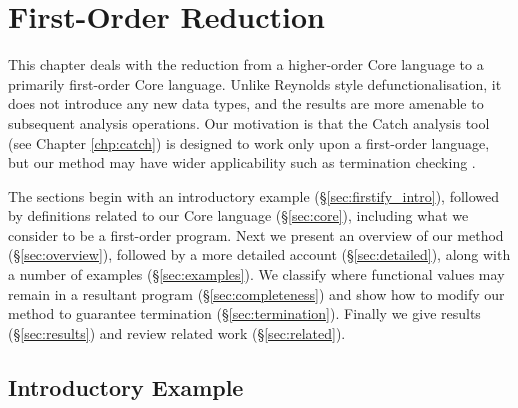 


\newenvironment{definition}
    {\smallskip
     \noindent\textbf{Definition:}}
    {\noexample}

\begin{comment}
\begin{code}
f = undefined
\end{code}
\begin{code}
primNeqInt, primEqInt :: Int -> Int -> Bool
\end{code}
\end{comment}



\chapter{First-Order Reduction}

This chapter deals with the reduction from a higher-order Core language to a primarily first-order Core language. Unlike Reynolds style defunctionalisation, it does not introduce any new data types, and the results are more amenable to subsequent analysis operations. Our motivation is that the Catch analysis tool (see Chapter \ref{chp:catch}) is designed to work only upon a first-order language, but our method may have wider applicability such as termination checking \cite{sereni:higher_order_termination}.

The sections begin with an introductory example (\S\ref{sec:firstify_intro}), followed by definitions related to our Core language (\S\ref{sec:core}), including what we consider to be a first-order program. Next we present an overview of our method (\S\ref{sec:overview}), followed by a more detailed account (\S\ref{sec:detailed}), along with a number of examples (\S\ref{sec:examples}). We classify where functional values may remain in a resultant program (\S\ref{sec:completeness}) and show how to modify our method to guarantee termination (\S\ref{sec:termination}). Finally we give results (\S\ref{sec:results}) and review related work (\S\ref{sec:related}).

\section{Introductory Example}

